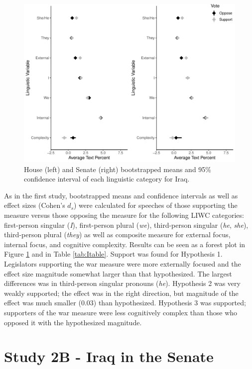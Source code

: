 \documentclass[
  english,
  ,man,floatsintext]{apa6}
\begin{document}
\begin{figure}
\centering
\includegraphics{Language-of-War-Markdown_KJ2_files/figure-latex/Ipic-1.pdf}
\caption{\label{fig:Ipic}House (left) and Senate (right) bootstrapped means and 95\% confidence interval of each linguistic category for Iraq.}
\end{figure}

As in the first study, bootstrapped means and confidence intervals as well as effect sizes (Cohen's \(d_s\)) were calculated for speeches of those supporting the measure versus those opposing the measure for the following LIWC categories: first-person singular (\emph{I}), first-person plural (\emph{we}), third-person singular (\emph{he}, \emph{she}), third-person plural (\emph{they}) as well as composite measure for external focus, internal focus, and cognitive complexity. Results can be seen as a forest plot in Figure \ref{fig:Ipic} and in Table \ref{tab:Itable}. Support was found for Hypothesis 1. Legislators supporting the war measure were more externally focused and the effect size magnitude somewhat larger than that hypothesized. The largest differences was in third-person singular pronouns (\emph{he}). Hypothesis 2 was very weakly supported; the effect was in the right direction, but magnitude of the effect was much smaller (0.03) than hypothesized. Hypothesis 3 was supported; supporters of the war measure were less cognitively complex than those who opposed it with the hypothesized magnitude.

\hypertarget{study-2b---iraq-in-the-senate}{%
\section{Study 2B - Iraq in the Senate}\label{study-2b---iraq-in-the-senate}}
\end{document}
